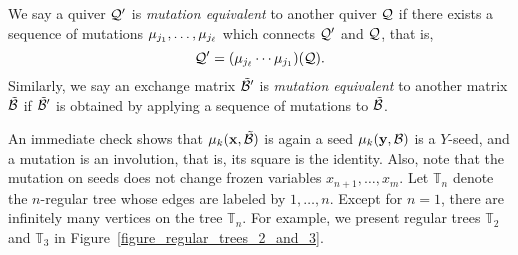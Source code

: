 We say a quiver $\mathcal{Q}'$ is \emph{mutation equivalent} to another quiver $\mathcal{Q}$ if 
there exists a sequence  of mutations $\mu_{j_1},\dots,\mu_{j_{\ell}}$ 
which connects $\mathcal{Q}'$ and $\mathcal{Q}$, that is,
\[
\mathcal{Q}' = (\mu_{j_{\ell}} \cdots \mu_{j_1})(\mathcal{Q}).
\]
Similarly, we say an exchange matrix $\mathcal{\tilde{B}}'$ is \emph{mutation equivalent} to another matrix $\mathcal{\tilde{B}}$ if $\mathcal{\tilde{B}}'$ is obtained by applying a sequence of mutations to $\mathcal{\tilde{B}}$. 


An immediate check shows that $\mu_k(\mathbf{x},\mathcal{\tilde{B}})$ is again a seed $\mu_k(\mathbf{y},\mathcal{B})$ is a $Y$-seed, and a mutation is an involution, that is, its square is the identity.
Also, note that the mutation on seeds does not change frozen variables $x_{n+1},\dots,x_m$.
Let $\mathbb{T}_n$ denote the $n$-regular tree whose edges are labeled by $1,\dots,n$. Except for $n = 1$, there are infinitely many vertices on the tree $\mathbb{T}_n$. For example, we present regular trees $\mathbb{T}_2$ and $\mathbb{T}_3$ in Figure~\ref{figure_regular_trees_2_and_3}.
